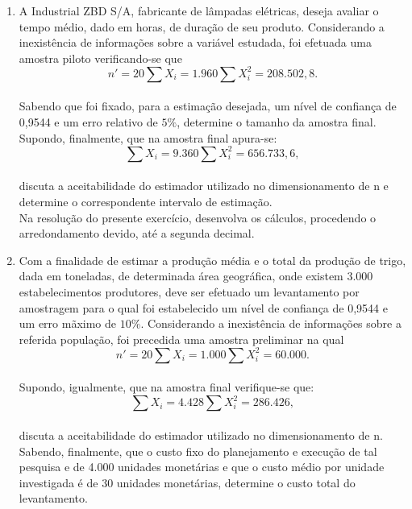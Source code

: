 \begin{enumerate}[resume]
\item A Industrial ZBD S/A, fabricante de lâmpadas elétricas, deseja avaliar o tempo médio, dado em horas, de duração de seu produto. Considerando a inexistência de informações sobre a variável estudada, foi efetuada uma amostra piloto verificando-se que \\
$$n' = 20 \sum X_{i} = 1.960  \sum X_{i}^{2} = 208.502,8.$$\\
Sabendo que foi fixado, para a estimação desejada, um nível de confiança de 0,9544 e um erro relativo de $5\%$, determine o tamanho da amostra final.\\
Supondo, finalmente, que na amostra final apura-se:\\
$$\sum X_{i} = 9.360  \sum X_{i}^{2} = 656.733,6,$$\\
discuta a aceitabilidade do estimador utilizado no dimensionamento de n e determine o correspondente intervalo de estimação. \\
Na resolução do presente exercício, desenvolva os cálculos, procedendo o arredondamento devido, até a segunda decimal.

\item Com a finalidade de estimar a produção média e o total da produção de trigo, dada em toneladas, de determinada área geográfica, onde existem 3.000 estabelecimentos produtores, deve ser efetuado um levantamento por amostragem para o qual foi estabelecido um nível de confiança de 0,9544 e um erro mãximo de $10\%$. Considerando a inexistência de informações sobre a referida população, foi precedida uma amostra preliminar na qual \\
$$n' = 20 \sum X_{i} = 1.000  \sum X_{i}^{2} = 60.000.$$\\
Supondo, igualmente, que na amostra final verifique-se que:\\
$$\sum X_{i} = 4.428  \sum X_{i}^{2} = 286.426,$$\\
discuta a aceitabilidade do estimador utilizado no dimensionamento de n. Sabendo, finalmente, que o custo fixo do planejamento e execução de tal pesquisa e de 4.000 unidades monetárias e que o custo médio por unidade investigada é de 30 unidades monetárias, determine o custo total do levantamento.


\end{enumerate}
